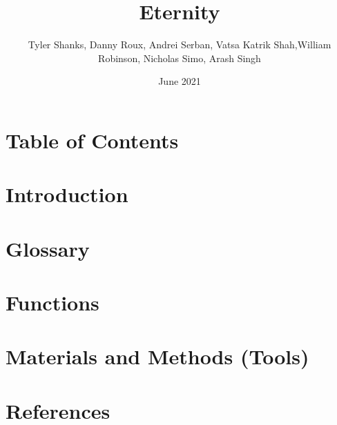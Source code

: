 \documentclass{article}
\title{Eternity}
\author{Tyler Shanks, Danny Roux, Andrei Serban, Vatsa Katrik Shah,\newpage William Robinson, Nicholas Simo, Arash Singh}
\date{June 2021}
\begin{document}
\maketitle

\section{Table of Contents}

\section{Introduction}

\section{Glossary}

\section{Functions}

\section{Materials and Methods (Tools)}

\section{References}
\end{document}
